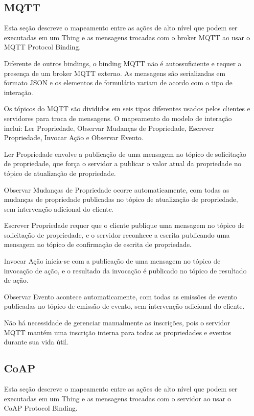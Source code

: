 \subsection{MQTT}

Esta seção descreve o mapeamento entre as ações de alto nível que podem ser executadas em um Thing e as mensagens trocadas com o broker MQTT ao usar o MQTT Protocol Binding.

Diferente de outros bindings, o binding MQTT não é autossuficiente e requer a presença de um broker MQTT externo. As mensagens são serializadas em formato JSON e os elementos de formulário variam de acordo com o tipo de interação.

Os tópicos do MQTT são divididos em seis tipos diferentes usados pelos clientes e servidores para troca de mensagens. O mapeamento do modelo de interação inclui: Ler Propriedade, Observar Mudanças de Propriedade, Escrever Propriedade, Invocar Ação e Observar Evento.

Ler Propriedade envolve a publicação de uma mensagem no tópico de solicitação de propriedade, que força o servidor a publicar o valor atual da propriedade no tópico de atualização de propriedade.

Observar Mudanças de Propriedade ocorre automaticamente, com todas as mudanças de propriedade publicadas no tópico de atualização de propriedade, sem intervenção adicional do cliente.

Escrever Propriedade requer que o cliente publique uma mensagem no tópico de solicitação de propriedade, e o servidor reconhece a escrita publicando uma mensagem no tópico de confirmação de escrita de propriedade.

Invocar Ação inicia-se com a publicação de uma mensagem no tópico de invocação de ação, e o resultado da invocação é publicado no tópico de resultado de ação.

Observar Evento acontece automaticamente, com todas as emissões de evento publicadas no tópico de emissão de evento, sem intervenção adicional do cliente.

Não há necessidade de gerenciar manualmente as inscrições, pois o servidor MQTT mantém uma inscrição interna para todas as propriedades e eventos durante sua vida útil.

\subsection{CoAP}

Esta seção descreve o mapeamento entre as ações de alto nível que podem ser executadas em um Thing e as mensagens trocadas com o servidor ao usar o CoAP Protocol Binding.

